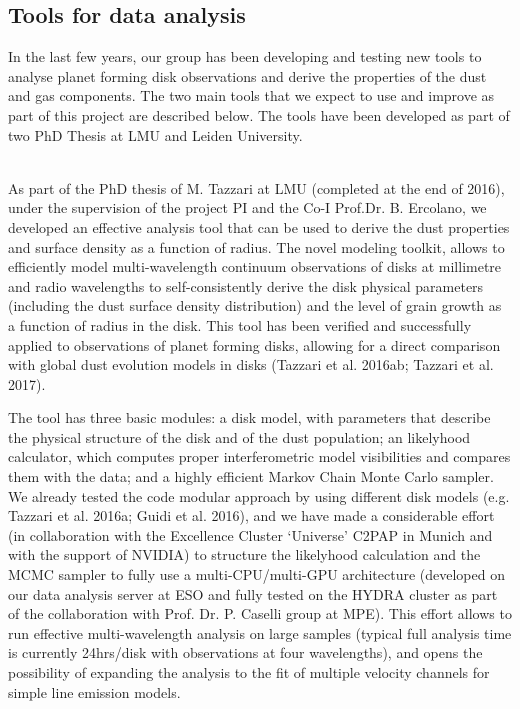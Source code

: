 \documentclass[10pt,fleqn,twoside]{article}
\begin{document}
\subsection{Tools for data analysis}
\label{s_tools}

In the last few years, our group has been developing and testing new tools to analyse planet forming disk observations and derive the properties of the dust and gas components. The two main tools that we expect to use and improve as part of this project are described below. The tools have been developed as part of two PhD Thesis at LMU and Leiden University.

\vspace{1em}{\Tcol\bf Dust properties and surface density as a function of radius}\\
As part of the PhD thesis of M. Tazzari at LMU (completed at the end of 2016), under the supervision of the project PI and the Co-I Prof.Dr. B. Ercolano, we developed an effective analysis tool that can be used to derive the dust properties and surface density as a function of radius. The novel modeling toolkit, allows to efficiently model multi-wavelength continuum observations of disks at millimetre and radio wavelengths to self-consistently derive the disk physical parameters (including the dust surface density distribution) and the level of grain growth as a function of radius in the disk. This tool has been verified and successfully applied to observations of planet forming disks, allowing for a direct comparison with global dust evolution models in disks (Tazzari et al. 2016ab; Tazzari et al. 2017).  

The tool has three basic modules: a disk model, with parameters that describe the physical structure of the disk and of the dust population; an likelyhood calculator, which computes proper interferometric model visibilities and compares them with the data; and a highly efficient Markov Chain Monte Carlo sampler.
We already tested the code modular approach by using different disk models (e.g. Tazzari et al. 2016a; Guidi et al. 2016), and we have made a considerable effort (in collaboration with the Excellence Cluster `Universe' C2PAP in Munich and with the support of NVIDIA) to structure the likelyhood calculation and the MCMC sampler to fully use a multi-CPU/multi-GPU architecture (developed on our data analysis server at ESO and fully tested on the HYDRA cluster as part of the collaboration with Prof. Dr. P. Caselli group at MPE). This effort allows to run effective multi-wavelength analysis on large samples (typical full analysis time is currently 24hrs/disk with observations at four wavelengths), and opens the possibility of expanding the analysis to the fit of multiple velocity channels for simple line emission models. 
\end{document}
